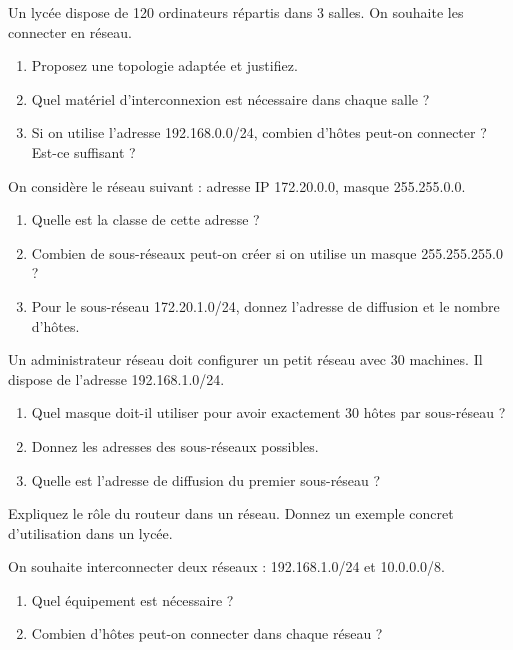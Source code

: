 
\sujetbac[2023, Cameroun]
\exo{}
Un lycée dispose de 120 ordinateurs répartis dans 3 salles. On souhaite les connecter en réseau.
\begin{enumerate}
    \item Proposez une topologie adaptée et justifiez.
    \item Quel matériel d'interconnexion est nécessaire dans chaque salle ?
    \item Si on utilise l'adresse 192.168.0.0/24, combien d'hôtes peut-on connecter ? Est-ce suffisant ?
\end{enumerate}

\sujetbac[2022, Cameroun]
\exo{}
On considère le réseau suivant : adresse IP 172.20.0.0, masque 255.255.0.0.
\begin{enumerate}
    \item Quelle est la classe de cette adresse ?
    \item Combien de sous-réseaux peut-on créer si on utilise un masque 255.255.255.0 ?
    \item Pour le sous-réseau 172.20.1.0/24, donnez l'adresse de diffusion et le nombre d'hôtes.
\end{enumerate}

\sujetbac[2021, Cameroun]
\exo{}
Un administrateur réseau doit configurer un petit réseau avec 30 machines. Il dispose de l'adresse 192.168.1.0/24.
\begin{enumerate}
    \item Quel masque doit-il utiliser pour avoir exactement 30 hôtes par sous-réseau ?
    \item Donnez les adresses des sous-réseaux possibles.
    \item Quelle est l'adresse de diffusion du premier sous-réseau ?
\end{enumerate}

\sujetbac[2020, Cameroun]
\exo{}
Expliquez le rôle du routeur dans un réseau. Donnez un exemple concret d'utilisation dans un lycée.

\sujetbac[2019, Cameroun]
\exo{}
On souhaite interconnecter deux réseaux : 192.168.1.0/24 et 10.0.0.0/8.
\begin{enumerate}
    \item Quel équipement est nécessaire ?
    \item Combien d'hôtes peut-on connecter dans chaque réseau ?
    \cite{Donnez les adresses de diffusion de chaque réseau.}
\end{enumerate}

